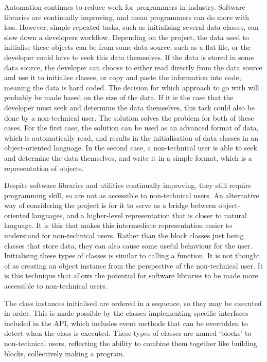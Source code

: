 \documentclass[
11pt,
english,
singlespacing,
headsepline,
]{MastersDoctoralThesis}
\begin{document}
Automation continues to reduce work for programmers in industry. Software libraries are continually improving, and mean programmers can do more with less. However, simple repeated tasks, such as initialising several data classes, can slow down a developers workflow. Depending on the project, the data used to initialise these objects can be from some data source, such as a flat file, or the developer could have to seek this data themselves. If the data is stored in some data source, the developer can choose to either read directly from the data source and use it to initialise classes, or copy and paste the information into code, meaning the data is hard coded. The decision for which approach to go with will probably be made based on the size of the data. If it is the case that the developer must seek and determine the data themselves, this task could also be done by a non-technical user. The solution solves the problem for both of these cases. For the first case, the solution can be used as an advanced format of data, which is automatically read, and results in the initialisation of data classes in an object-oriented language. In the second case, a non-technical user is able to seek and determine the data themselves, and write it in a simple format, which is a representation of objects.\par
Despite software libraries and utilities continually improving, they still require programming skill, so are not as accessible to non-technical users. An alternative way of considering the project is for it to serve as a bridge between object-oriented languages, and a higher-level representation that is closer to natural language. It is this that makes this intermediate representation easier to understand for non-technical users. Rather than the block classes just being classes that store data, they can also cause some useful behaviour for the user. Initialising these types of classes is similar to calling a function. It is not thought of as creating an object instance from the perspective of the non-technical user. It is this technique that allows the potential for software libraries to be made more accessible to non-technical users.\par
The class instances initialised are ordered in a sequence, so they may be executed in order. This is made possible by the classes implementing specific interfaces included in the API, which includes event methods that can be overridden to detect when the class is executed. These types of classes are named ‘blocks’ to non-technical users, reflecting the ability to combine them together like building blocks, collectively making a program.
\end{document}

